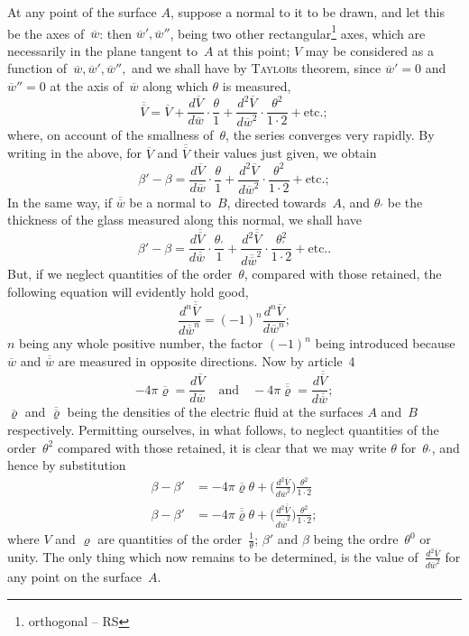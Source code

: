 \documentclass[12pt,notitlepage]{amsart}
\let\Person\textsc
\renewcommand{\rho}{\varrho}
\begin{document}
At any point of the surface $A$, suppose a normal to it to be drawn,
and let this be the axes of~$\overline{w}$:
then $\overline{w}',\overline{w}''$,
being two other rectangular\footnote{orthogonal -- RS} axes,
which are necessarily in the plane tangent to~$A$ at this point; $V$ may be
considered as a function of~$\overline{w},\overline{w}',\overline{w}'',$
and we shall have by \Person{Taylor}s
theorem, since $\overline{w}'=0$ and
$\overline{w}''=0$ at the axis of~$\overline{w}$
along which $\theta$ is measured,
\[
\overline{\overline{V}}=\overline{V}
+\frac{d\overline{V}}{d\overline{w}}\cdot\frac\theta1
+\frac{d^2\overline{V}}{d\overline{w}^2}\cdot\frac{\theta^2}{1\cdot2}
+\text{etc.};
\]
where, on account of the smallness of~$\theta$,
the series converges very rapidly.
By writing in the above, for $\overline{V}$ and
$\overline{\overline{V}}$ their values just given, we obtain
\[
\beta'-\beta=
\frac{d\overline{V}}{d\overline{w}}\cdot\frac\theta1
+\frac{d^2\overline{V}}{d\overline{w}^2}\cdot\frac{\theta^2}{1\cdot2}
+\text{etc.};
\]
In the same way, if $\overline{\overline{w}}$ be a normal to~$B$,
directed towards~$A$, and $\theta_\prime$ be the
thickness of the glass measured along this normal, we shall have
\[
\beta'-\beta=
\frac{d\overline{\overline{V}}}{d\overline{\overline{w}}}
\cdot\frac{\theta_\prime}{1}
+\frac{d^2\overline{\overline{V}}}{d\overline{\overline{w}}^2}
\cdot\frac{\theta_\prime^2}{1\cdot2}
+\text{etc.}.
\]
But, if we neglect quantities of the order~$\theta$,
compared with those retained,
the following equation will evidently hold good,
\[
\frac{d^n\overline{\overline{V}}}{d\overline{\overline{w}}^n}
=(-1)^n\frac{d^n\overline{V}}{d\overline{w}^n};
\]
$n$ being any whole positive number,
the factor $(-1)^n$ being introduced because
$\overline{w}$ and $\overline{\overline{w}}$
are measured in opposite directions. Now by article~4
\[
-4\pi\overline{\rho}=
\frac{d\overline{V}}{d\overline{w}}
\quad\text{and}\quad
-4\pi\overline{\overline{\rho}}=
\frac{d\overline{\overline{V}}}{d\overline{\overline{w}}};
\]
$\overline\rho$ and $\overline{\overline\rho}$
being the densities of the electric fluid at the
surfaces $A$ and~$B$ respectively.
Permitting ourselves, in what follows, to neglect quantities of the
order~$\theta^2$ compared with those retained,
it is clear that we may write $\theta$ for~$\theta_\prime$,
and hence by substitution
\[
\begin{aligned}
\beta-\beta' &=
-4\pi\overline{\rho}\theta+
\biggl(\frac{d^2\overline{V}}{d\overline{w}^2}\biggr)
\frac{\theta^2}{1\cdot2}\\
\beta-\beta' &=
-4\pi\overline{\overline{\rho}}\theta+
\biggl(\frac{d^2\overline{\overline{V}}}{d\overline{\overline{w}}^2}\biggr)
\frac{\theta^2}{1\cdot2};
\end{aligned}
\]
where $V$ and $\rho$ are quantities of the order~$\frac1\theta$;
$\beta'$ and $\beta$ being the ordre~$\theta^0$
or unity. The only thing which now remains to be determined, is the value
of~$\frac{d^2\overline{V}}{d\overline{w}^2}$
for any point on the surface~$A$.
\end{document}
